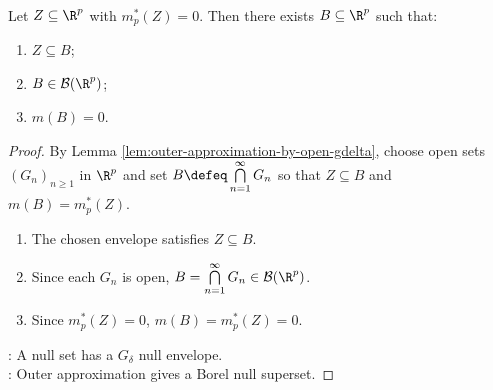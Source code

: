 \begin{corollary} \label{cor:null-sets-in-borel-null-sets} \\
Let $Z\subseteq\R^p$ with $m_p^\ast(Z)=0$. Then there exists $B\subseteq\R^p$ such that:
\begin{enumerate}[label=(\roman*)]
\setlength{\itemsep}{0pt}
\item $Z\subseteq B$;
\item $B\in\mathcal{B}(\R^p)$;
\item $m(B)=0$.
\end{enumerate}
\begin{proof}
By Lemma \ref{lem:outer-approximation-by-open-gdelta}, choose open sets $(G_n)_{n\geq1}$ in $\R^p$ and set $B\defeq\bigcap\limits_{n=1}^{\infty}G_n$ so that $Z\subseteq B$ and $m(B)=m_p^\ast(Z)$.
\begin{enumerate}[label=(\roman*)]
\setlength{\itemsep}{0pt}
\item The chosen envelope satisfies $Z\subseteq B$.
\item Since each $G_n$ is open, $B=\bigcap\limits_{n=1}^{\infty}G_n\in\mathcal{B}(\R^p)$.
\item Since $m_p^\ast(Z)=0$, $m(B)=m_p^\ast(Z)=0$.
\end{enumerate}
: A null set has a $G_\delta$ null envelope.\\
: Outer approximation gives a Borel null superset.
\end{proof}
\end{corollary}


